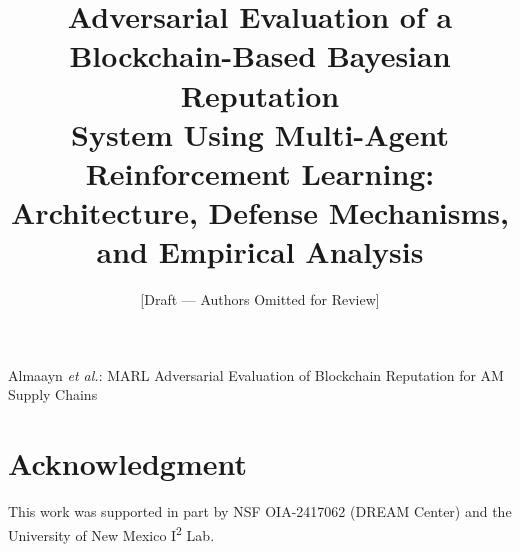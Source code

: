\documentclass[journal]{IEEEtran}
\begin{document}

\title{Adversarial Evaluation of a Blockchain-Based Bayesian Reputation\\
System Using Multi-Agent Reinforcement Learning:\\
Architecture, Defense Mechanisms, and Empirical Analysis}


\author{[Draft — Authors Omitted for Review]}


\maketitle

%
{Almaayn \MakeLowercase{\textit{et al.}}: MARL Adversarial Evaluation of Blockchain Reputation for AM Supply Chains}









\section*{Acknowledgment}
This work was supported in part by NSF OIA-2417062 (DREAM Center) and the
University of New Mexico I\textsuperscript{2} Lab.



\end{document}

